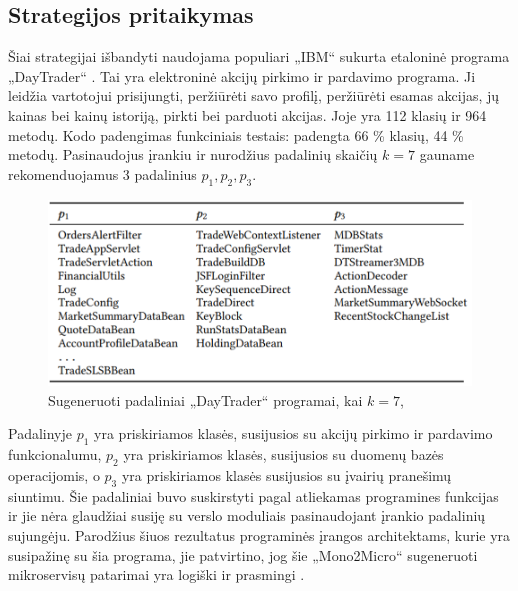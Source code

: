 \documentclass[fleqn]{VUMIFPSkursinis}
\begin{document}
\subsection{Strategijos pritaikymas}
Šiai strategijai išbandyti naudojama populiari „IBM“ sukurta etaloninė programa „DayTrader“ \cite{IBM15}. Tai yra elektroninė akcijų pirkimo ir pardavimo programa. Ji leidžia vartotojui prisijungti, peržiūrėti savo profilį, peržiūrėti esamas akcijas, jų kainas bei kainų istoriją, pirkti bei parduoti akcijas. Joje yra 112 klasių ir 964 metodų. Kodo padengimas funkciniais testais: padengta  66 \% klasių, 44 \% metodų. Pasinaudojus įrankiu ir nurodžius padalinių skaičių $k = 7$ gauname rekomenduojamus 3 padalinius $p_{1}, p_{2}, p_{3}$.

\begin{figure}[H]
    \centering
    \includegraphics{img/mono-micro-padaliniai.png}
    \caption{Sugeneruoti padaliniai „DayTrader“ programai, kai $k = 7$, \cite{KXK+21}}
    \label{img:mono-micro-padaliniai}
\end{figure}

Padalinyje $p_{1}$ yra priskiriamos klasės, susijusios su akcijų pirkimo ir pardavimo funkcionalumu, $p_{2}$ yra priskiriamos klasės, susijusios su duomenų bazės operacijomis, o $p_{3}$ yra priskiriamos klasės susijusios su įvairių pranešimų siuntimu. Šie padaliniai buvo suskirstyti pagal atliekamas programines funkcijas ir jie nėra glaudžiai susiję su verslo moduliais pasinaudojant įrankio padalinių sujungėju. Parodžius šiuos rezultatus programinės įrangos architektams, kurie yra susipažinę su šia programa, jie patvirtino, jog šie „Mono2Micro“ sugeneruoti mikroservisų patarimai yra logiški ir prasmingi \cite{KXL+20}.\\
\end{document}
